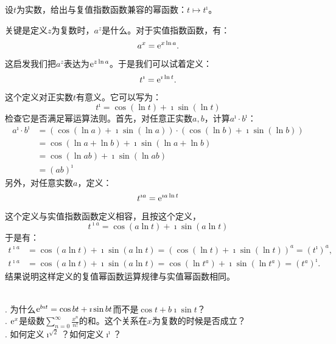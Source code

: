 \documentclass[12pt,UTF8,fontset=none]{ctexbook}
\begin{document}
\begin{et}
    设$t$为实数，给出与复值指数函数兼容的幂函数：$t\mapsto t^{\imath}$。
\end{et}

\begin{so}
    关键是定义$z$为复数时，$a^{z}$是什么。对于实值指数函数，有：
    $$ a^{x} = \mathrm{e}^{x\ln{a}}. $$
    这启发我们把$a^{z}$表达为$\mathrm{e}^{z\ln{a}}$。于是我们可以试着定义：
    $$ t^{\imath} = \mathrm{e}^{\imath \ln{t}}. $$
    这个定义对正实数$t$有意义。它可以写为：
    $$ t^{\imath} = \cos{(\ln{t})} + \imath \sin{(\ln{t})} $$
    检查它是否满足幂运算法则。首先，对任意正实数$a,b$，计算$a^{\imath} \cdot b^{\imath}$：
    \begin{align*}
        a^{\imath} \cdot b^{\imath} &= (\cos{(\ln{a})} + \imath \sin{(\ln{a})}) \cdot (\cos{(\ln{b})} + \imath \sin{(\ln{b})}) \\
        &= \cos{(\ln{a} + \ln{b})} + \imath \sin{(\ln{a} + \ln{b})} \\
        &= \cos{(\ln{ab})} + \imath \sin{(\ln{ab})} \\
        &= (ab)^{\imath}
    \end{align*}
    另外，对任意实数$a$，定义：
    $$ t^{\imath a} = \mathrm{e}^{\imath a\ln{t}} $$
    这个定义与实值指数函数定义相容，且按这个定义，
    $$  t^{\imath a} = \cos{(a\ln{t})} + \imath \sin{(a\ln{t})} $$
    于是有：
    \begin{align*}
        t^{\imath a} &= \cos{(a\ln{t})} + \imath \sin{(a\ln{t})} = (\cos{(\ln{t})} + \imath \sin{(\ln{t})})^a = \left(t^\imath\right)^{a}, \\
        t^{\imath a} &= \cos{(a\ln{t})} + \imath \sin{(a\ln{t})} = \cos{(\ln{t^a})} + \imath \sin{(\ln{t^a})} = \left(t^a\right)^{\imath}.
    \end{align*}
    结果说明这样定义的复值幂函数运算规律与实值幂函数相同。
\end{so}

\begin{sk}
    \mbox{} \\
    . 为什么$\mathrm{e}^{b\imath t} = \cos{bt} + \imath \sin{bt}$而不是$\cos{t} + b\imath \sin{t}$？\\
    . $\mathrm{e}^x$是级数$\sum_{n=0}^{\infty} \frac{x^n}{n!}$的和。这个关系在$x$为复数的时候是否成立？\\
    . 如何定义$\imath^{\sqrt{2}}$？如何定义$\imath^{\imath}$？
\end{sk}
\end{document}
